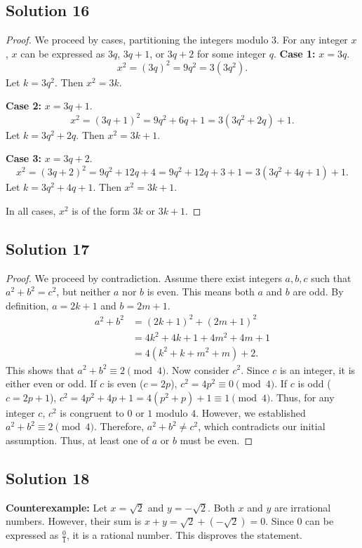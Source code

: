 \documentclass[11pt]{article}
\begin{document}
\subsection{Solution 16}
\begin{proof}
We proceed by cases, partitioning the integers modulo $3$. For any integer $x$, $x$ can be expressed as $3q$, $3q+1$, or $3q+2$ for some integer $q$.
\textbf{Case 1:} $x = 3q$.
\[ x^2 = (3q)^2 = 9q^2 = 3(3q^2). \]
Let $k = 3q^2$. Then $x^2 = 3k$.

\textbf{Case 2:} $x = 3q+1$.
\[ x^2 = (3q+1)^2 = 9q^2 + 6q + 1 = 3(3q^2 + 2q) + 1. \]
Let $k = 3q^2 + 2q$. Then $x^2 = 3k + 1$.

\textbf{Case 3:} $x = 3q+2$.
\[ x^2 = (3q+2)^2 = 9q^2 + 12q + 4 = 9q^2 + 12q + 3 + 1 = 3(3q^2 + 4q + 1) + 1. \]
Let $k = 3q^2 + 4q + 1$. Then $x^2 = 3k + 1$.

In all cases, $x^2$ is of the form $3k$ or $3k+1$.
\end{proof}

\subsection{Solution 17}
\begin{proof}
We proceed by contradiction. Assume there exist integers $a, b, c$ such that $a^2 + b^2 = c^2$, but neither $a$ nor $b$ is even. This means both $a$ and $b$ are odd.
By definition, $a = 2k+1$ and $b = 2m+1$.
\begin{align*}
a^2 + b^2 &= (2k+1)^2 + (2m+1)^2 \\
&= 4k^2 + 4k + 1 + 4m^2 + 4m + 1 \\
&= 4(k^2 + k + m^2 + m) + 2.
\end{align*}
This shows that $a^2 + b^2 \equiv 2 \pmod 4$.
Now consider $c^2$. Since $c$ is an integer, it is either even or odd.
If $c$ is even ($c=2p$), $c^2 = 4p^2 \equiv 0 \pmod 4$.
If $c$ is odd ($c=2p+1$), $c^2 = 4p^2+4p+1 = 4(p^2+p)+1 \equiv 1 \pmod 4$.
Thus, for any integer $c$, $c^2$ is congruent to $0$ or $1$ modulo $4$.
However, we established $a^2 + b^2 \equiv 2 \pmod 4$. Therefore, $a^2 + b^2 \neq c^2$, which contradicts our initial assumption. Thus, at least one of $a$ or $b$ must be even.
\end{proof}

\subsection{Solution 18}
\textbf{Counterexample:} Let $x = \sqrt{2}$ and $y = -\sqrt{2}$. Both $x$ and $y$ are irrational numbers. However, their sum is $x + y = \sqrt{2} + (-\sqrt{2}) = 0$. Since $0$ can be expressed as $\frac{0}{1}$, it is a rational number. This disproves the statement.
\end{document}
